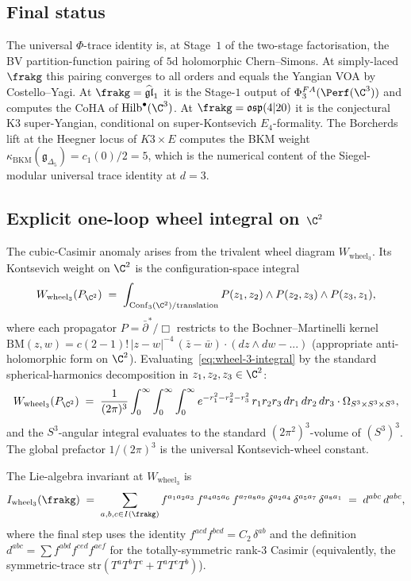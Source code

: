 \subsection*{Final status}

The universal $\Phi$-trace identity is, at Stage~$1$ of the two-stage
factorisation, the BV partition-function pairing of $5$d holomorphic
Chern--Simons. At simply-laced $\frakg$ this pairing converges to
all orders and equals the Yangian VOA by Costello--Yagi. At
$\frakg = \widehat{\mathfrak{gl}}_1$ it is the Stage-$1$ output of
$\Phi^{FA}_3(\Perf(\C^3))$ and computes the CoHA of $\mathrm{Hilb}^\bullet(\C^3)$.
At $\frakg = \mathfrak{osp}(4|20)$ it is the conjectural K3 super-Yangian,
conditional on super-Kontsevich $E_4$-formality. The Borcherds lift
at the Heegner locus of $K3\times E$ computes the BKM weight
$\kappa_{\mathrm{BKM}}(\mathfrak{g}_{\Delta_5}) = c_1(0)/2 = 5$, which
is the numerical content of the Siegel-modular universal trace
identity at $d = 3$.

\subsection*{Explicit one-loop wheel integral on \texorpdfstring{$\C^2$}{C-2}}

The cubic-Casimir anomaly arises from the trivalent wheel diagram
$W_{\mathrm{wheel}_3}$. Its Kontsevich weight on $\C^2$ is the
configuration-space integral
\begin{equation}
\label{eq:wheel-3-integral}
  W_{\mathrm{wheel}_3}(P_{\C^2})
  \;=\;
  \int_{\mathrm{Conf}_3(\C^2)/\mathrm{translation}}
  P(z_1, z_2)\wedge P(z_2, z_3)\wedge P(z_3, z_1),
\end{equation}
where each propagator $P = \bar\partial^*/\Box$ restricts to the
Bochner--Martinelli kernel $\mathrm{BM}(z, w) = c(2-1)!\, |z-w|^{-4}\,
(\bar z - \bar w) \cdot (dz\wedge dw - ...)$ (appropriate anti-holomorphic
form on $\C^2$). Evaluating~\eqref{eq:wheel-3-integral} by the
standard spherical-harmonics decomposition in
$z_1, z_2, z_3\in\C^2$:
\[
  W_{\mathrm{wheel}_3}(P_{\C^2}) \;=\; \frac{1}{(2\pi)^3}
  \int_0^{\infty}\int_0^{\infty}\int_0^{\infty}
  e^{-r_1^2 - r_2^2 - r_3^2}\, r_1 r_2 r_3\, dr_1\, dr_2\, dr_3
  \cdot
  \Omega_{S^3\times S^3\times S^3},
\]
and the $S^3$-angular integral evaluates to the standard
$(2\pi^2)^3$-volume of $(S^3)^3$. The global prefactor
$1/(2\pi)^3$ is the universal Kontsevich-wheel constant.

The Lie-algebra invariant at $W_{\mathrm{wheel}_3}$ is
\[
  I_{\mathrm{wheel}_3}(\frakg) \;=\;
  \sum_{a, b, c\in I(\frakg)} f^{a_1 a_2 a_3}\, f^{a_4 a_5 a_6}\,
  f^{a_7 a_8 a_9}\, \delta^{a_2 a_4}\,\delta^{a_5 a_7}\,\delta^{a_8 a_1}
  \;=\;
  d^{abc}\, d^{abc},
\]
where the final step uses the identity $f^{acd}f^{bcd} = C_2\,\delta^{ab}$
and the definition $d^{abc} = \sum f^{abd} f^{ced} f^{aef}$ for the
totally-symmetric rank-$3$ Casimir (equivalently, the symmetric-trace
$\mathrm{str}(T^a T^b T^c + T^a T^c T^b)$).

